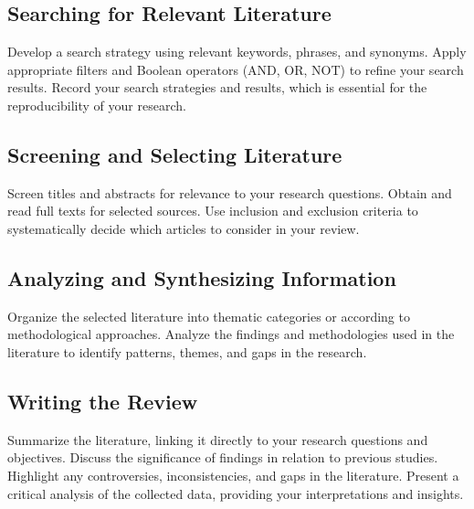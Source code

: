 \subsection{Searching for Relevant Literature}
Develop a search strategy using relevant keywords, phrases, and synonyms. Apply appropriate filters and Boolean operators (AND, OR, NOT) to refine your search results. Record your search strategies and results, which is essential for the reproducibility of your research.

\subsection{Screening and Selecting Literature}
Screen titles and abstracts for relevance to your research questions. Obtain and read full texts for selected sources. Use inclusion and exclusion criteria to systematically decide which articles to consider in your review.

\subsection{Analyzing and Synthesizing Information}
Organize the selected literature into thematic categories or according to methodological approaches. Analyze the findings and methodologies used in the literature to identify patterns, themes, and gaps in the research.

\subsection{Writing the Review}
Summarize the literature, linking it directly to your research questions and objectives. Discuss the significance of findings in relation to previous studies. Highlight any controversies, inconsistencies, and gaps in the literature. Present a critical analysis of the collected data, providing your interpretations and insights.




